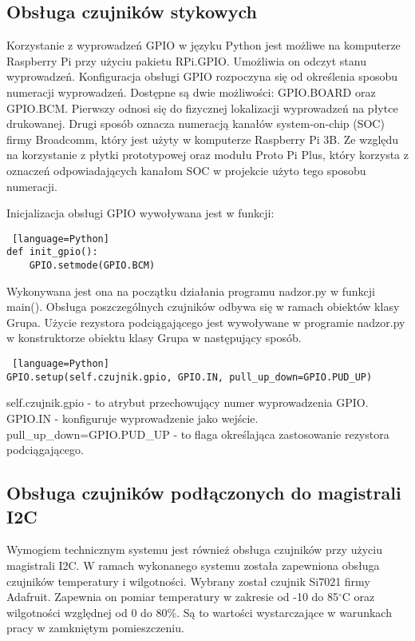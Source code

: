 \documentclass[a4paper,12pt,twoside]{article}
\begin{document}
\subsection{Obsługa czujników stykowych}
Korzystanie z wyprowadzeń GPIO w języku Python jest możliwe na komputerze Raspberry Pi przy użyciu pakietu RPi.GPIO. Umożliwia on odczyt stanu wyprowadzeń. Konfiguracja obsługi GPIO rozpoczyna się od określenia sposobu numeracji wyprowadzeń. Dostępne są dwie możliwości: GPIO.BOARD oraz GPIO.BCM. Pierwszy odnosi się do fizycznej lokalizacji wyprowadzeń na płytce drukowanej. Drugi sposób oznacza numeracją kanałów system-on-chip (SOC) firmy Broadcomm, który jest użyty w komputerze Raspberry Pi 3B. Ze względu na korzystanie z płytki prototypowej oraz modułu Proto Pi Plus, który korzysta z oznaczeń odpowiadających kanałom SOC w projekcie użyto tego sposobu numeracji.

Inicjalizacja obsługi GPIO wywoływana jest w funkcji:  
\begin{lstlisting} [language=Python]
def init_gpio():
    GPIO.setmode(GPIO.BCM)
\end{lstlisting}
Wykonywana jest ona na początku działania programu nadzor.py w funkcji main(). Obsługa poszczególnych czujników odbywa się w ramach obiektów klasy Grupa. Użycie rezystora podciągającego jest wywoływane w programie nadzor.py w konstruktorze obiektu klasy Grupa w następujący sposób.
\begin{lstlisting} [language=Python]
GPIO.setup(self.czujnik.gpio, GPIO.IN, pull_up_down=GPIO.PUD_UP)
\end{lstlisting}
self.czujnik.gpio - to atrybut przechowujący numer wyprowadzenia GPIO.
GPIO.IN - konfiguruje wyprowadzenie jako wejście.
pull{\_}up{\_}down=GPIO.PUD{\_}UP - to flaga określająca zastosowanie rezystora podciągającego.
\subsection{Obsługa czujników podłączonych do magistrali I2C}
Wymogiem technicznym systemu jest również obsługa czujników przy użyciu magistrali I2C. W ramach wykonanego systemu została zapewniona obsługa czujników temperatury i wilgotności. Wybrany został czujnik Si7021 firmy Adafruit. Zapewnia on pomiar temperatury w zakresie od -10 do 85$^\circ$C oraz wilgotności względnej od 0 do 80\%. Są to wartości wystarczające w warunkach pracy w zamkniętym pomieszczeniu.
\end{document}

